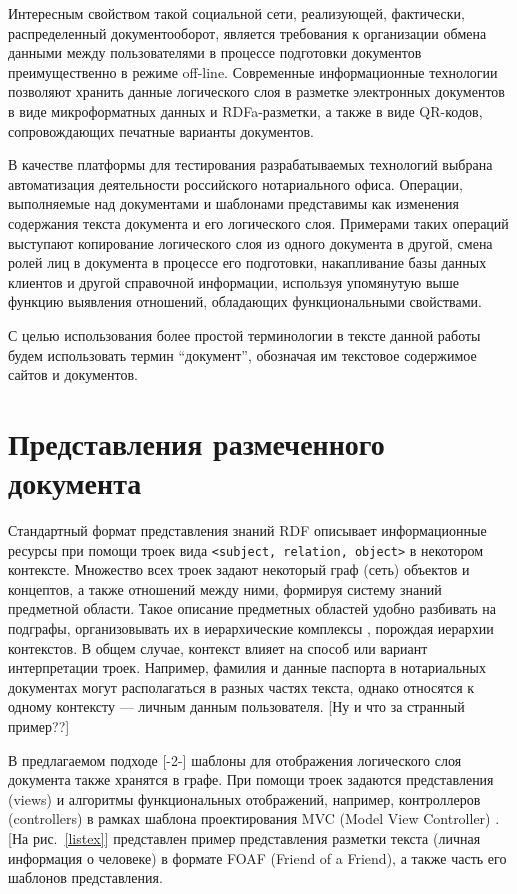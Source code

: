 \documentclass[utf8]{../IncArticle}
\newcommand{\e}[2][fcolor]{\textcolor{pcolor}{[}\textcolor{#1}{#2}\textcolor{pcolor}{]}}
\begin{document}
Интересным свойством такой социальной сети, реализующей, фактически,
распределенный документооборот, является требования к организации
обмена данными между пользователями в процессе подготовки документов
преимущественно в режиме off-line.  Современные информационные
технологии позволяют хранить данные логического слоя в разметке
электронных документов в виде микроформатных данных и RDFa-разметки, а
также в виде QR-кодов, сопровождающих печатные варианты документов.

В качестве платформы для тестирования разрабатываемых технологий
выбрана автоматизация деятельности российского нотариального
офиса.  Операции, выполняемые над документами и шаблонами представимы
как изменения содержания текста документа и его логического
слоя.  Примерами таких операций выступают копирование логического слоя
из одного документа в другой, смена ролей лиц в документа в процессе
его подготовки, накапливание базы данных клиентов и другой справочной
информации, используя упомянутую выше функцию выявления отношений,
обладающих функциональными свойствами.

С целью использования более
простой терминологии в тексте данной работы будем использовать термин
``документ'', обозначая им текстовое содержимое сайтов и документов.

\section{Представления размеченного документа}

Стандартный формат представления знаний RDF описывает информационные
ресурсы при помощи троек вида \texttt{<subject, relation, object>} в
некотором контексте.  Множество всех троек задают некоторый граф (сеть)
объектов и концептов, а также отношений между ними, формируя систему
знаний предметной области.  Такое описание предметных областей удобно
разбивать на подграфы, организовывать их в иерархические комплексы
\cite{b4}, порождая иерархии контекстов.  В общем случае, контекст
влияет на способ или вариант интерпретации троек.  Например, фамилия и
данные паспорта в нотариальных документах могут располагаться в разных
частях текста, однако относятся к одному контексту --- личным данным
пользователя.  \e{Ну и что за странный пример??}

В предлагаемом подходе [-2-] шаблоны для отображения логического слоя
документа также хранятся в графе.  При помощи троек задаются
представления (views) и алгоритмы функциональных отображений,
например, контроллеров (controllers) в рамках шаблона проектирования
MVC (Model View Controller) \cite{b2:5}.  \e{На рис.~\ref{listex}}
представлен пример представления разметки текста (личная информация о
человеке) в формате FOAF (Friend of a Friend), а также часть его
шаблонов представления.
\end{document}
